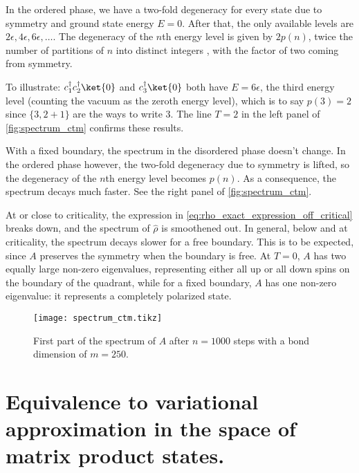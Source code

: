 In the ordered phase, we have a two-fold degeneracy for every state due to symmetry and
ground state energy $E = 0$.
After that, the only available levels are $2\epsilon, 4\epsilon, 6\epsilon,
\dots$.
The degeneracy of the $n$th energy level is given by $2p(n)$, twice the number of partitions of $n$ into distinct integers
\cite{okunishi1999universal}, with the factor of two coming from symmetry.

To illustrate:
$c^{\dagger}_1 c^{\dagger}_2 \ket{0}$ and $c^{\dagger}_3 \ket{0}$ both have $E = 6\epsilon$,
the third energy level (counting the vacuum as the zeroth energy level),
which is to say $p(3) = 2$ since $\{3, 2 + 1 \}$ are the ways to write $3$.
The line $T = 2$ in the left panel of \autoref{fig:spectrum_ctm} confirms these results.

With a fixed boundary, the spectrum in the disordered phase doesn't change.
In the ordered phase however, the two-fold degeneracy due to symmetry is lifted,
so the degeneracy of the $n$th energy level becomes $p(n)$.
As a consequence, the spectrum decays much faster. See the right panel of \autoref{fig:spectrum_ctm}.

At or close to criticality, the expression in \autoref{eq:rho_exact_expression_off_critical} breaks down,
and the spectrum of $\hat{\rho}$ is smoothened out.
In general, below and at criticality, the spectrum decays slower for a free boundary.
This is to be expected, since $A$ preserves the symmetry when the boundary is free.
At $T = 0$, $A$ has two equally large non-zero eigenvalues, representing either all up or all down spins on the boundary
of the quadrant, while for a fixed boundary, $A$ has one non-zero eigenvalue:
it represents a completely polarized state.

\begin{figure}
  \texttt{[image: spectrum\_ctm.tikz]}
  \caption{First part of the spectrum of $A$ after $n = 1000$ steps with a bond dimension of $m =
  250$.}\label{fig:spectrum_ctm}
\end{figure}

\section{Equivalence to variational approximation in the space of matrix product states.}

